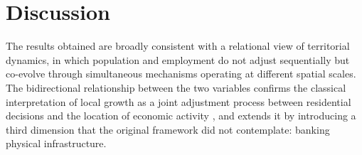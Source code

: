 \documentclass[a4paper,11pt,oneside]{article}
\newcommand{\Emili}{\color{emili}}
\begin{document}
{%








\section{Discussion}
\label{sec:discussion}

The results obtained are broadly consistent with a relational view of territorial dynamics, in which population and employment do not adjust sequentially but co-evolve through simultaneous mechanisms operating at different spatial scales. The bidirectional relationship between the two variables confirms the classical interpretation of local growth as a joint adjustment process between residential decisions and the location of economic activity \citep{carlino1987determinants}, and extends it by introducing a third dimension that the original framework did not contemplate: banking physical infrastructure.

}
\end{document}
